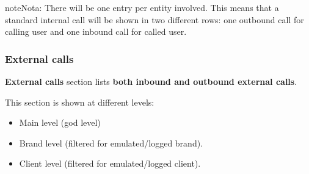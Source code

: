\documentclass[letterpaper,10pt,spanish]{sphinxmanual}
\begin{document}
\begin{notice}{note}{Nota:}
There will be one entry per entity involved. This means that a standard internal call will be shown
in two different rows: one outbound call for calling user and one inbound call for called user.
\end{notice}


\subsubsection{External calls}
\label{administration_portal/client/vpbx/calls/external_calls::doc}\label{administration_portal/client/vpbx/calls/external_calls:external-calls}
\textbf{External calls} section lists \textbf{both inbound and outbound external calls}.

This section is shown at different levels:
\begin{itemize}
\item {} 
Main level (god level)

\item {} 
Brand level (filtered for emulated/logged brand).

\item {} 
Client level (filtered for emulated/logged client).

\end{itemize}
\end{document}
